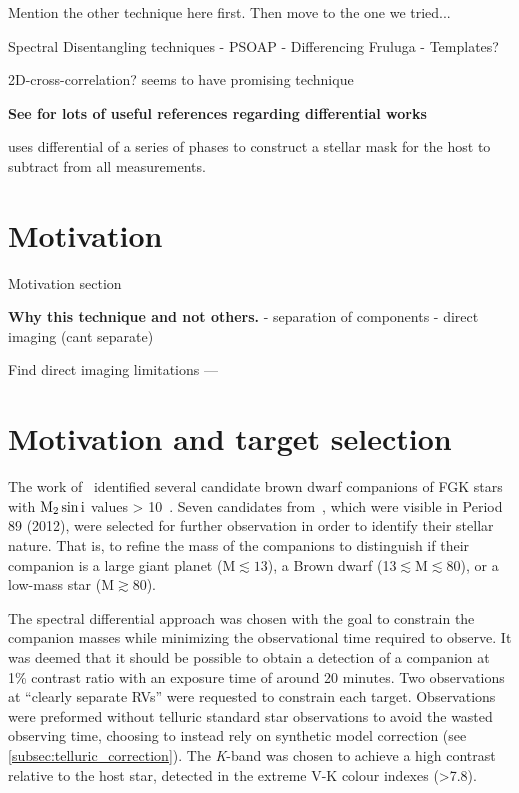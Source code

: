 Mention the other technique here first.
Then move to the one we tried...




Spectral Disentangling techniques
- PSOAP
- Differencing Fruluga
- Templates?

2D-cross-correlation?   \citet{piskorz_evidence_2016} seems to have promising technique


\textbf{
See \citet{kostogryz_spectral_2013} for lots of useful references regarding differential works \citet{simon_disentangling_1994}}

\citet{rodler_weighing_2012} uses differential of a series of phases to construct a stellar mask for the host to subtract from all measurements.




\section{Motivation}

Motivation section

\textbf{Why this technique and not others.}
- separation of components
- direct imaging (cant separate)


Find direct imaging limitations ---




\section{Motivation and target selection}
\label{sec:target_motivation}
The work of~\citet{sahlmann_search_2011} identified several candidate brown dwarf companions of FGK stars with \(\rm M_2 \sin{i}\) values > 10~\Mjup{}.
Seven candidates from~\citet{sahlmann_search_2011}, which were visible in Period 89 (2012), were selected for further observation in order to identify their stellar nature.
That is, to refine the mass of the companions to distinguish if their companion is a large giant planet (M$\apprle13$\Mjup), a Brown dwarf (13$\apprle $M$\apprle80$\Mjup), or a low-mass star (M$\apprge80$\Mjup).

The spectral differential approach was chosen with the goal to constrain the companion masses while minimizing the observational time required to observe.
It was deemed that it should be possible to obtain a detection of a companion at 1\% contrast ratio with an exposure time of around 20 minutes.
Two observations at ``clearly separate RVs'' were requested to constrain each target.
Observations were preformed without telluric standard star observations to avoid the wasted observing time, choosing to instead rely on synthetic model correction (see \cref{subsec:telluric_correction}).
The \textit{K}-band was chosen to achieve a high contrast relative to the host star, detected in the extreme V-K colour indexes (>7.8).

